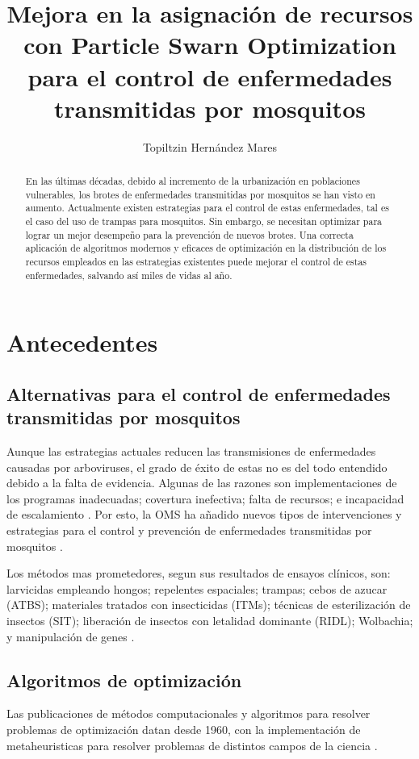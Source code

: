 \documentclass[letterpaper, 10pt, conference]{ieeeconf}
\title{\bf
  Mejora en la asignación de recursos con Particle Swarn Optimization para el control de enfermedades transmitidas por mosquitos
}
\author{Topiltzin Hernández Mares}
\begin{document}
\maketitle
\thispagestyle{empty}
\pagestyle{empty}

\begin{abstract}
  En las últimas décadas, debido al incremento de la urbanización en poblaciones vulnerables, los brotes de enfermedades transmitidas por mosquitos se han visto en aumento. Actualmente existen estrategias para el control de estas enfermedades, tal es el caso del uso de trampas para mosquitos. Sin embargo, se necesitan optimizar para lograr un mejor desempeño para la prevención de nuevos brotes. Una correcta aplicación de algoritmos modernos y eficaces de optimización en la distribución de los recursos empleados en las estrategias existentes puede mejorar el control de estas enfermedades, salvando así miles de vidas al año.
\end{abstract}

\section{Antecedentes}

\subsection{Alternativas para el control de enfermedades transmitidas por mosquitos}
Aunque las estrategias actuales reducen las transmisiones de enfermedades causadas por arboviruses, el grado de éxito de estas no es del todo entendido debido a la falta de evidencia. Algunas de las razones son implementaciones de los programas inadecuadas; covertura inefectiva; falta de recursos; e incapacidad de escalamiento \cite{AltStrategies}. Por esto, la OMS ha añadido nuevos tipos de intervenciones y estrategias para el control y prevención de enfermedades transmitidas por mosquitos \cite{WHOOverviewVCAG}.

Los métodos mas prometedores, segun sus resultados de ensayos clínicos, son: larvicidas empleando hongos; repelentes espaciales; trampas; cebos de azucar (ATBS); materiales tratados con insecticidas (ITMs); técnicas de esterilización de insectos (SIT); liberación de insectos con letalidad dominante (RIDL); Wolbachia; y manipulación de genes \cite{AltStrategies}.

\subsection{Algoritmos de optimización}
Las publicaciones de métodos computacionales y algoritmos para resolver problemas de optimización datan desde 1960, con la implementación de metaheuristicas para resolver problemas de distintos campos de la ciencia \cite{SwarmVsEvol}.
\end{document}
